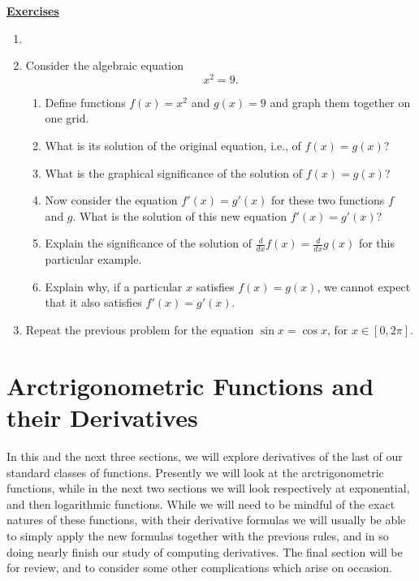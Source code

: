 \begin{center}\underline{\Large{\bf Exercises}}\end{center}
\bigskip
\begin{multicols}{2}
\begin{enumerate}
\item
\item Consider the algebraic equation
 $$x^2=9.$$
 \begin{enumerate}
 \item Define  functions $f(x)=x^2$ and $g(x)=9$ and graph them
       together  on one grid.
 \item What is its solution of the original equation, i.e.,
       of $f(x)=g(x)$?
 \item What is the graphical significance of the solution
       of $f(x)=g(x)$?
 \item Now consider the equation $f'(x)=g'(x)$ for these two 
       functions $f$ and $g$. What is the solution
       of this new equation $f'(x)=g'(x)$?
 \item Explain the significance of the solution of
       $\frac{d}{dx}f(x)=\frac{d}{dx}g(x)$
       for this particular example.
 \item Explain why, if a particular $x$ satisfies $f(x)=g(x)$,
       we cannot expect that it also satisfies $f'(x)=g'(x)$.
 \end{enumerate}
\item Repeat the previous problem for the equation $\sin x=\cos x$,
      for $x\in[0,2\pi]$.
\end{enumerate}

\end{multicols}


\newpage
\section{Arctrigonometric Functions and their Derivatives}

In this and the next three sections, we will explore derivatives of
the last of our standard classes of functions.
Presently we will look at the arctrigonometric functions, while
in the next two sections we will look respectively at exponential, and
then logarithmic functions.  While we will need to be mindful of
the exact natures of these functions, with their derivative formulas 
we will usually  be able to simply apply the new formulas
together with the previous rules, and in so doing nearly 
finish our study of computing
derivatives.  The final section will be for review, and to consider
some other complications which arise on occasion.





